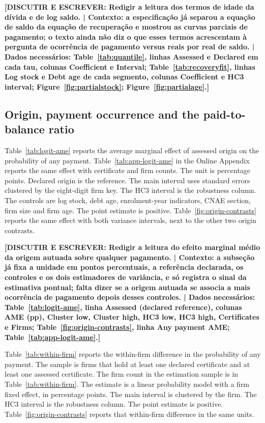\textbf{[DISCUTIR E ESCREVER: Redigir a leitura dos termos de idade da dívida e de log saldo. | Contexto: a especificação já separou a equação de saldo da equação de recuperação e mostrou as curvas parciais de pagamento; o texto ainda não diz o que esses termos acrescentam à pergunta de ocorrência de pagamento versus reais por real de saldo. | Dados necessários: Table~\ref{tab:quantile}, linhas Assessed e Declared em cada tau, colunas Coefficient e Interval; Table~\ref{tab:recoveryfit}, linhas Log stock e Debt age de cada segmento, colunas Coefficient e HC3 interval; Figure~\ref{fig:partialstock}; Figure~\ref{fig:partialage}.]}

\subsection{Origin, payment occurrence and the paid-to-balance ratio}\label{sec:origin-models}

Table~\ref{tab:logit-ame} reports the average marginal effect of assessed origin on the probability of any payment.
Table~\ref{tab:app-logit-ame} in the Online Appendix reports the same effect with certificate and firm counts.
The unit is percentage points.
Declared origin is the reference.
The main interval uses standard errors clustered by the eight-digit firm key.
The HC3 interval is the robustness column.
The controls are log stock, debt age, enrolment-year indicators, CNAE section, firm size and firm age.
The point estimate is positive.
Table~\ref{fig:origin-contrasts} reports the same effect with both variance intervals, next to the other two origin contrasts.

\textbf{[DISCUTIR E ESCREVER: Redigir a leitura do efeito marginal médio da origem autuada sobre qualquer pagamento. | Contexto: a subseção já fixa a unidade em pontos percentuais, a referência declarada, os controles e os dois estimadores de variância, e só registra o sinal da estimativa pontual; falta dizer se a origem autuada se associa a mais ocorrência de pagamento depois desses controles. | Dados necessários: Table~\ref{tab:logit-ame}, linha Assessed (declared reference), colunas AME (pp), Cluster low, Cluster high, HC3 low, HC3 high, Certificates e Firms; Table~\ref{fig:origin-contrasts}, linha Any payment AME; Table~\ref{tab:app-logit-ame}.]}



Table~\ref{tab:within-firm} reports the within-firm difference in the probability of any payment.
The sample is firms that hold at least one declared certificate and at least one assessed certificate.
The firm count in the estimation sample is in Table~\ref{tab:within-firm}.
The estimate is a linear probability model with a firm fixed effect, in percentage points.
The main interval is clustered by the firm.
The HC3 interval is the robustness column.
The point estimate is positive.
Table~\ref{fig:origin-contrasts} reports that within-firm difference in the same units.

